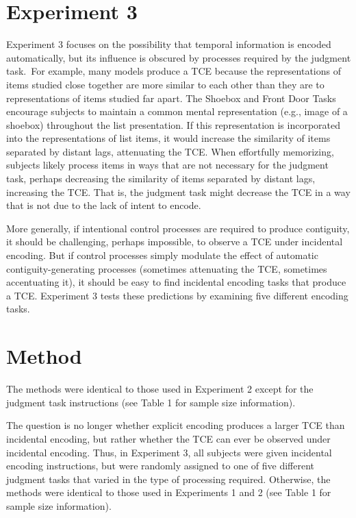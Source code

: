 \documentclass[man,natbib,floatsintext]{apa6} %
\begin{document}
\section{Experiment 3}
Experiment 3 focuses on the possibility that temporal information is encoded automatically, but its influence is obscured by processes required by the judgment task.~For example, many models produce a TCE because the representations of items studied close together are more similar to each other than they are to representations of items studied far apart. The Shoebox and Front Door Tasks encourage subjects to maintain a common mental representation (e.g., image of a shoebox) throughout the list presentation. If this representation is incorporated into the representations of list items, it would increase the similarity of items separated by distant lags, attenuating the TCE. When effortfully memorizing, subjects likely process items in ways that are not necessary for the judgment task, perhaps decreasing the similarity of items separated by distant lags, increasing the TCE. That is, the judgment task might decrease the TCE in a way that is not due to the lack of intent to encode.

More generally, if intentional control processes are required to produce contiguity, it should be challenging, perhaps impossible, to observe a TCE under incidental encoding. But if control processes simply modulate the effect of automatic contiguity-generating processes (sometimes attenuating the TCE, sometimes accentuating it), it should be easy to find incidental encoding tasks that produce a TCE. Experiment 3 tests these predictions by examining five different encoding tasks.

\section{Method}
The methods were identical to those used in Experiment 2 except for the judgment task instructions (see Table 1 for sample size information).

The question is no longer whether explicit encoding produces a larger TCE than incidental encoding, but rather whether the TCE can ever be observed under incidental encoding. Thus, in Experiment 3, all subjects were given incidental encoding instructions, but were randomly assigned to one of five different judgment tasks that varied in the type of processing required. Otherwise, the methods were identical to those used in Experiments 1 and 2 (see Table 1 for sample size information).
\end{document}
